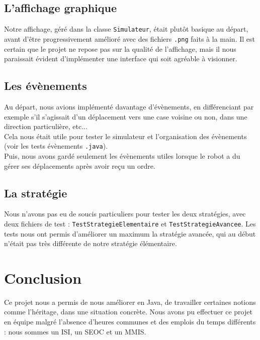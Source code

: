 \documentclass[12pt]{article}
\begin{document}
\subsection{L'affichage graphique}

Notre affichage, géré dans la classe {\tt Simulateur}, était plutôt basique au départ, avant d'être progressivement amélioré avec des fichiers {\tt .png} faits à la main. Il est certain que le projet ne repose pas sur la qualité de l'affichage, mais il nous paraissait évident d'implémenter une interface qui soit agréable à visionner.

\subsection{Les évènements}

Au départ, nous avions implémenté davantage d'évènements, en différenciant par exemple s'il s'agissait d'un déplacement vers une case voisine ou non, dans une direction particulière, etc... \\
Cela nous était utile pour tester le simulateur et l'organisation des évènements (voir les tests évènements {\tt .java}).\\
Puis, nous avons gardé seulement les évènements utiles lorsque le robot a du gérer ses déplacements après avoir reçu un ordre.

\subsection{La stratégie}
Nous n'avons pas eu de soucis particuliers pour tester les deux stratégies, avec deux fichiers de test : {\tt TestStrategieElementaire} et {\tt TestStrategieAvancee}. Les tests nous ont permis d'améliorer un maximum la stratégie avancée, qui au début n'était pas très différente de notre stratégie élémentaire.


\section{Conclusion}

Ce projet nous a permis de nous améliorer en Java, de travailler certaines notions comme l'héritage, dans une situation concrète. Nous avons pu effectuer ce projet en équipe malgré l'absence d'heures communes et des emplois du temps différents : nous sommes un ISI, un SEOC et un MMIS.\\
\end{document}
